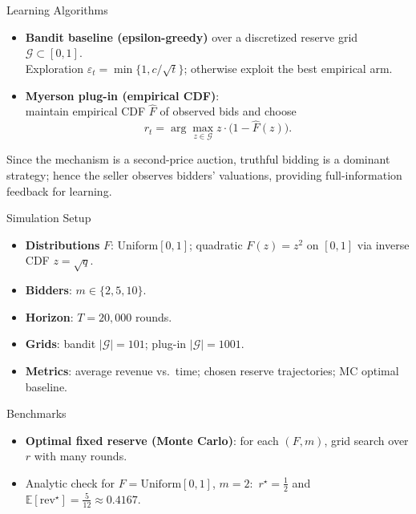 \documentclass{beamer}
\begin{document}
\begin{frame}{Learning Algorithms}
  \begin{itemize}
    \item \textbf{Bandit baseline (epsilon-greedy)} over a discretized reserve grid $\mathcal{G}\subset[0,1]$.\\
          Exploration $\varepsilon_t=\min\{1,c/\sqrt{t}\}$; otherwise exploit the best empirical arm.
    \item \textbf{Myerson plug-in (empirical CDF)}:\\
          maintain empirical CDF $\hat F$ of observed bids and choose
          \[
            r_t=\arg\max_{z\in\mathcal{G}} z\cdot\bigl(1-\hat F(z)\bigr).
          \]
  \end{itemize}
{\footnotesize
Since the mechanism is a second-price auction, truthful bidding is a dominant strategy; hence the seller observes bidders' valuations, providing full-information feedback for learning.
}
\end{frame}

\begin{frame}{Simulation Setup}
  \begin{itemize}
    \item \textbf{Distributions} $F$: Uniform$[0,1]$; quadratic $F(z)=z^2$ on $[0,1]$ via inverse CDF $z=\sqrt{q}$.
    \item \textbf{Bidders}: $m\in\{2,5,10\}$.
    \item \textbf{Horizon}: $T=20{,}000$ rounds.
    \item \textbf{Grids}: bandit $|\mathcal{G}|=101$; plug-in $|\mathcal{G}|=1001$.
    \item \textbf{Metrics}: average revenue vs.\ time; chosen reserve trajectories; MC optimal baseline.
  \end{itemize}
\end{frame}

\begin{frame}{Benchmarks}
  \begin{itemize}
    \item \textbf{Optimal fixed reserve (Monte Carlo)}: for each $(F,m)$, grid search over $r$ with many rounds.
    \item Analytic check for $F=\mathrm{Uniform}[0,1]$, $m=2$:~$r^\star=\tfrac{1}{2}$ and $\mathbb{E}[\mathrm{rev}^\star]=\tfrac{5}{12}\approx 0.4167$.
  \end{itemize}
\end{frame}
\end{document}
